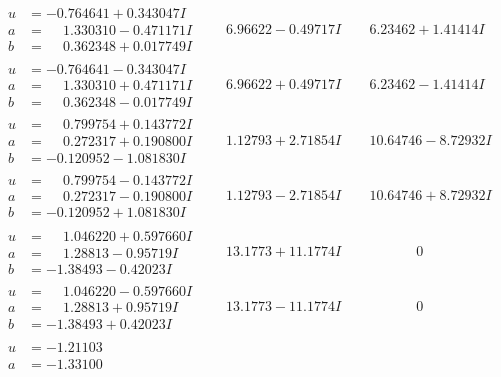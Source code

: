\documentclass[1p]{elsarticle_modified}
\theoremstyle{definition}
\begin{document}
$$\begin{array}{c|c|c}
\begin{aligned}
u &= -0.764641 + 0.343047 I \\
a &= \phantom{-}1.330310 - 0.471171 I \\
b &= \phantom{-}0.362348 + 0.017749 I\end{aligned}
 & \phantom{-}6.96622 - 0.49717 I & \phantom{-}6.23462 + 1.41414 I \\ \hline\begin{aligned}
u &= -0.764641 - 0.343047 I \\
a &= \phantom{-}1.330310 + 0.471171 I \\
b &= \phantom{-}0.362348 - 0.017749 I\end{aligned}
 & \phantom{-}6.96622 + 0.49717 I & \phantom{-}6.23462 - 1.41414 I \\ \hline\begin{aligned}
u &= \phantom{-}0.799754 + 0.143772 I \\
a &= \phantom{-}0.272317 + 0.190800 I \\
b &= -0.120952 - 1.081830 I\end{aligned}
 & \phantom{-}1.12793 + 2.71854 I & \phantom{-}10.64746 - 8.72932 I \\ \hline\begin{aligned}
u &= \phantom{-}0.799754 - 0.143772 I \\
a &= \phantom{-}0.272317 - 0.190800 I \\
b &= -0.120952 + 1.081830 I\end{aligned}
 & \phantom{-}1.12793 - 2.71854 I & \phantom{-}10.64746 + 8.72932 I \\ \hline\begin{aligned}
u &= \phantom{-}1.046220 + 0.597660 I \\
a &= \phantom{-}1.28813 - 0.95719 I \\
b &= -1.38493 - 0.42023 I\end{aligned}
 & \phantom{-}13.1773 + 11.1774 I & \phantom{-0.000000 } 0 \\ \hline\begin{aligned}
u &= \phantom{-}1.046220 - 0.597660 I \\
a &= \phantom{-}1.28813 + 0.95719 I \\
b &= -1.38493 + 0.42023 I\end{aligned}
 & \phantom{-}13.1773 - 11.1774 I & \phantom{-0.000000 } 0 \\ \hline\begin{aligned}
u &= -1.21103\phantom{ +0.000000I} \\
a &= -1.33100\phantom{ +0.000000I} \\

\end{aligned}
\end{array}$$
\end{document}
